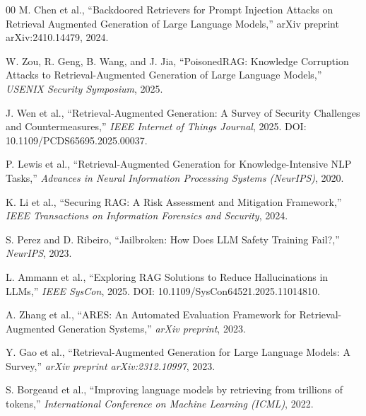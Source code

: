 \documentclass[conference]{IEEEtran}
\begin{document}
\begin{thebibliography}{00}
 M. Chen et al., ``Backdoored Retrievers for Prompt Injection Attacks on Retrieval Augmented Generation of Large Language Models,'' arXiv preprint arXiv:2410.14479, 2024.

 W. Zou, R. Geng, B. Wang, and J. Jia, ``PoisonedRAG: Knowledge Corruption Attacks to Retrieval-Augmented Generation of Large Language Models,'' \emph{USENIX Security Symposium}, 2025.

 J. Wen et al., ``Retrieval-Augmented Generation: A Survey of Security Challenges and Countermeasures,'' \emph{IEEE Internet of Things Journal}, 2025. DOI: 10.1109/PCDS65695.2025.00037.

 P. Lewis et al., ``Retrieval-Augmented Generation for Knowledge-Intensive NLP Tasks,'' \emph{Advances in Neural Information Processing Systems (NeurIPS)}, 2020.

 K. Li et al., ``Securing RAG: A Risk Assessment and Mitigation Framework,'' \emph{IEEE Transactions on Information Forensics and Security}, 2024.

 S. Perez and D. Ribeiro, ``Jailbroken: How Does LLM Safety Training Fail?,'' \emph{NeurIPS}, 2023.

 L. Ammann et al., ``Exploring RAG Solutions to Reduce Hallucinations in LLMs,'' \emph{IEEE SysCon}, 2025. DOI: 10.1109/SysCon64521.2025.11014810.

 A. Zhang et al., ``ARES: An Automated Evaluation Framework for Retrieval-Augmented Generation Systems,'' \emph{arXiv preprint}, 2023.

 Y. Gao et al., ``Retrieval-Augmented Generation for Large Language Models: A Survey,'' \emph{arXiv preprint arXiv:2312.10997}, 2023.

 S. Borgeaud et al., ``Improving language models by retrieving from trillions of tokens,'' \emph{International Conference on Machine Learning (ICML)}, 2022.

\end{thebibliography}
\end{document}
